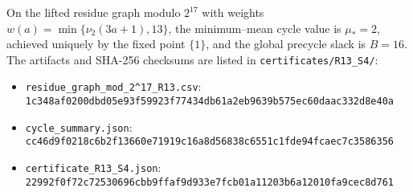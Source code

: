 \begin{proposition}[Certificate at $(R,S)=(13,4)$]\label{prop:R13S4}
On the lifted residue graph modulo $2^{17}$ with weights $w(a)=\min\{\nu_2(3a+1),13\}$,
the minimum–mean cycle value is $\mu_*=2$, achieved uniquely by the fixed point $\{1\}$,
and the global precycle slack is $B=16$. The artifacts and SHA-256 checksums are listed in
\texttt{certificates/R13\_S4/}:
\begin{itemize}
\item \texttt{residue\_graph\_mod\_2\^{}17\_R13.csv}:
\texttt{1c348af0200dbd05e93f59923f77434db61a2eb9639b575ec60daac332d8e40a}
\item \texttt{cycle\_summary.json}:
\texttt{cc46d9f0218c6b2f13660e71919c16a8d56838c6551c1fde94fcaec7c3586356}
\item \texttt{certificate\_R13\_S4.json}:
\texttt{22992f0f72c72530696cbb9ffaf9d933e7fcb01a11203b6a12010fa9cec8d761}
\end{itemize}
\end{proposition}
